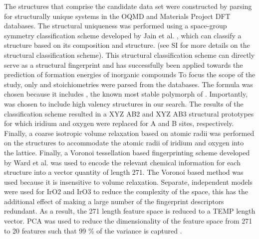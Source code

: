 


The structures that comprise the candidate data set were constructed by parsing for structurally unique systems in the OQMD and Materials Project DFT databases.
%
The structural uniqueness was performed using a space-group symmetry classification scheme developed by Jain et al. \cite{Jain2018},
which can classify a structure based on its composition and structure.
 (see SI for more details on the structural classification scheme).
%
This structural classification scheme can directly serve as a structural fingerprint and has successfully been applied towards the prediction of formation energies of inorganic compounds \cite{Jain2018}
%
To focus the scope of the study, only \ABtwo  and \ABthree stoichiometries were parsed from the databases.
%
The \ABtwo formula was chosen because it includes \rIrOtwo, the known most stable polymorph of \IrOtwo.
%
Importantly, \ABthree was chosen to include high valency \IrOthree structures in our search.
%
The results of the classification scheme resulted in a XYZ AB2 and XYZ AB3 structural prototypes for which iridium and oxygen were replaced for A and B sites, respectively.
%
Finally, a coarse isotropic volume relaxation based on atomic radii was performed on the structures to accommodate the atomic radii of iridium and oxygen into the lattice.
%
Finally, a Voronoi tessellation based fingerprinting scheme developed by Ward et al. \cite{Ward2017} was used to encode the relevant chemical information for each structure into a vector quantity of length 271.
%
The Voronoi based method was used because it is insensitive to volume relaxation.
%
Separate, independent models were used for IrO2 and IrO3 to reduce the complexity of the space, this has the additional effect of making a large number of the fingerprint descriptors redundant.
As a result, the 271 length feature space is reduced to a TEMP length vector.
%
PCA was used to reduce the dimensionality of the feature space from 271 to 20 features such that 99 \% of the variance is captured \cite{Tipping1999}.


